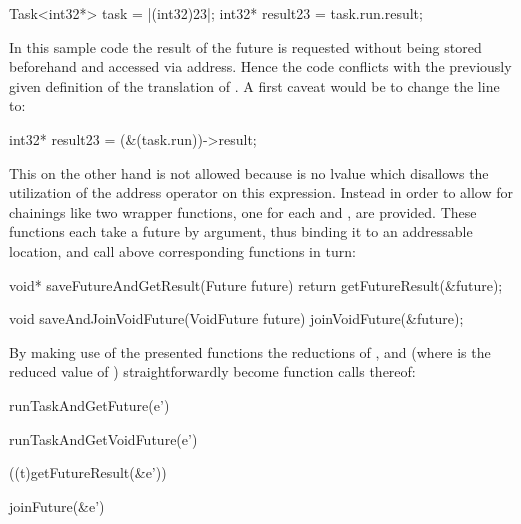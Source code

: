 \begin{ccode}
Task<int32*> task = |(int32)23|;
int32* result23 = task.run.result;
\end{ccode}

In this sample code the result of the future is requested without being stored beforehand and accessed via address. Hence the code conflicts with the previously given definition of the translation of . A first caveat would be to change the line to:

\begin{ccode}
int32* result23 = (&(task.run))->result;
\end{ccode}

This on the other hand is not allowed because  is no lvalue \cite[pp.~147-148]{CPrimerPlus} which disallows the utilization of the address operator on this expression. Instead in order to allow for chainings like  two wrapper functions, one for each  and , are provided. These functions each take a future by argument, thus binding it to an addressable location, and call above corresponding functions in turn:
\begin{ccode}
void* saveFutureAndGetResult(Future future) { 
  return getFutureResult(&future); 
}

void saveAndJoinVoidFuture(VoidFuture future) { 
  joinVoidFuture(&future); 
}
\end{ccode}

By making use of the presented functions the reductions of ,  and  (where  is the reduced value of ) straightforwardly become function calls thereof:

\begin{minipage}{0.5\textwidth}
\begin{ccode}
runTaskAndGetFuture(e')
\end{ccode}
\end{minipage}
\begin{minipage}{0.5\textwidth}
\begin{ccode}
runTaskAndGetVoidFuture(e')
\end{ccode}
\end{minipage}

\begin{minipage}{0.5\textwidth}
\begin{ccode}
((t)getFutureResult(&e'))
\end{ccode}
\end{minipage}
\begin{minipage}{0.5\textwidth}
\begin{ccode}
joinFuture(&e')
\end{ccode}
\end{minipage}

